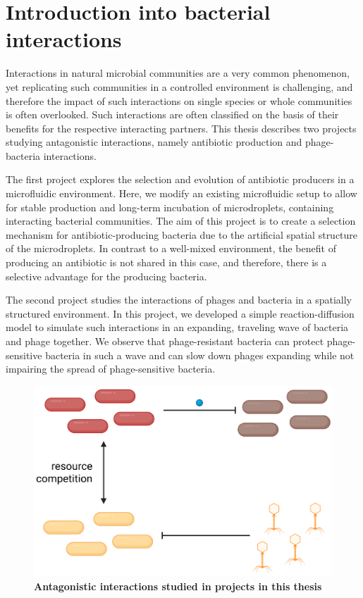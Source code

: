 \chapter{Introduction into bacterial interactions}
Interactions in natural microbial communities are a very common phenomenon, yet replicating such communities in a controlled environment is challenging, and therefore the impact of such interactions on single species or whole communities is often overlooked. Such interactions are often classified on the basis of their benefits for the respective interacting partners. This thesis describes two projects studying antagonistic interactions, namely antibiotic production and phage-bacteria interactions. 

The first project explores the selection and evolution of antibiotic producers in a microfluidic environment. Here, we modify an existing microfluidic setup to allow for stable production and long-term incubation of microdroplets, containing interacting bacterial communities. The aim of this project is to create a selection mechanism for antibiotic-producing bacteria due to the artificial spatial structure of the microdroplets. In contrast to a well-mixed environment, the benefit of producing an antibiotic is not shared in this case, and therefore, there is a selective advantage for the producing bacteria. 

The second project studies the interactions of phages and bacteria in a spatially structured environment. In this project, we developed a simple reaction-diffusion model to simulate such interactions in an expanding, traveling wave of bacteria and phage together. We observe that phage-resistant bacteria can protect phage-sensitive bacteria in such a wave and can slow down phages expanding while not impairing the spread of phage-sensitive bacteria.

\begin{figure}
\includegraphics[width=\linewidth]{graphics/2025_09_28_intro_fig1.png}

\caption{\textbf{Antagonistic interactions studied in projects in this thesis}}
\label{fig:intro_shared_interactions}
\end{figure}